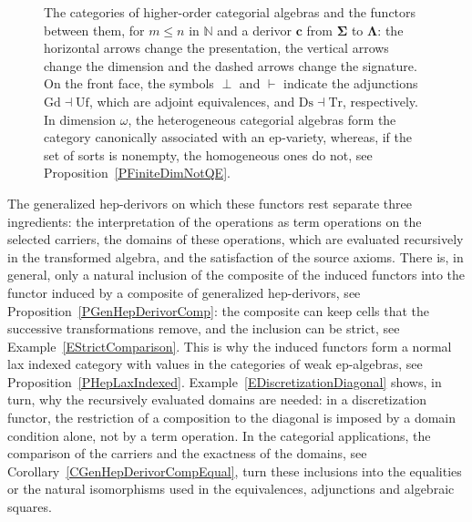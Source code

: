 \documentclass[a4paper, reqno]{amsbook}
\newcommand{\sig}[1]{\mathbf{#1}}             %
\newcommand{\htg}{\mathrm{htg}}                %
\newcommand{\Gd}{\mathrm{Gd}}
\newcommand{\Uf}{\mathrm{Uf}}
\newcommand{\Ds}{\mathrm{Ds}}
\newcommand{\Tr}{\mathrm{Tr}}
\theoremstyle{plain}
\theoremstyle{definition}
\begin{document}
\begin{figure}[tp]
\caption{The categories of higher-order categorial algebras and the functors between them, for $m\leq n$ in $\mathbb{N}$ and a derivor $\mathbf{c}$ from $\sig{\Sigma}$ to $\sig{\Lambda}$: the horizontal arrows change the presentation, the vertical arrows change the dimension and the dashed arrows change the signature. On the front face, the symbols $\perp$ and $\vdash$ indicate the adjunctions $\Gd\dashv\Uf$, which are adjoint equivalences, and $\Ds\dashv\Tr$, respectively. In dimension $\omega$, the heterogeneous categorial algebras form the category canonically associated with an ep-variety, whereas, if the set of sorts is nonempty, the homogeneous ones do not, see Proposition~\ref{PFiniteDimNotQE}.}\label{FFunctorsSummary}
\end{figure}

The generalized hep-derivors on which these functors rest separate three ingredients: the interpretation of the operations as term operations on the selected carriers, the domains of these operations, which are evaluated recursively in the transformed algebra, and the satisfaction of the source axioms.
There is, in general, only a natural inclusion of the composite of the induced functors into the functor induced by a composite of generalized hep-derivors, see Proposition~\ref{PGenHepDerivorComp}: the composite can keep cells that the successive transformations remove, and the inclusion can be strict, see Example~\ref{EStrictComparison}.
This is why the induced functors form a normal lax indexed category with values in the categories of weak ep-algebras, see Proposition~\ref{PHepLaxIndexed}.
Example~\ref{EDiscretizationDiagonal} shows, in turn, why the recursively evaluated domains are needed: in a discretization functor, the restriction of a composition to the diagonal is imposed by a domain condition alone, not by a term operation.
In the categorial applications, the comparison of the carriers and the exactness of the domains, see Corollary~\ref{CGenHepDerivorCompEqual}, turn these inclusions into the equalities or the natural isomorphisms used in the equivalences, adjunctions and algebraic squares.
\end{document}
